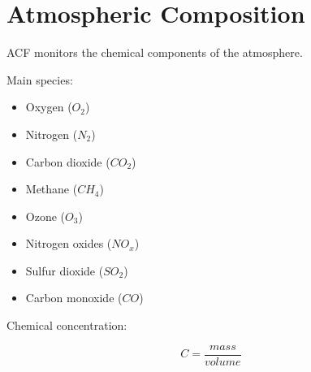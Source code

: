 \section{Atmospheric Composition}


ACF monitors the chemical components of the atmosphere.



Main species:


\begin{itemize}

\item Oxygen ($O_2$)

\item Nitrogen ($N_2$)

\item Carbon dioxide ($CO_2$)

\item Methane ($CH_4$)

\item Ozone ($O_3$)

\item Nitrogen oxides ($NO_x$)

\item Sulfur dioxide ($SO_2$)

\item Carbon monoxide ($CO$)

\end{itemize}



Chemical concentration:


\[
C=\frac{mass}{volume}
\]
